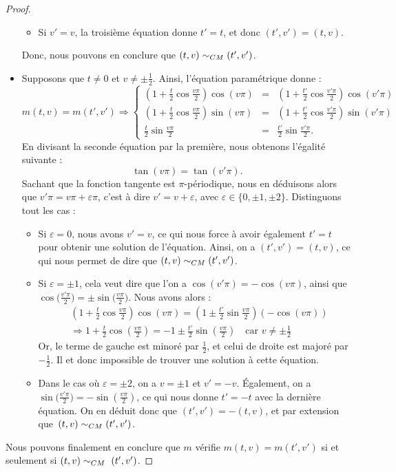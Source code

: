 \documentclass[hidelinks, 10pt]{article}
\begin{document}
\begin{proof}
\begin{itemize}
\begin{itemize}
    \item Si $v'=v$, la troisième équation donne $t'=t$, et donc $(t',v')=(t,v)$.
\end{itemize}
Donc, nous pouvons en conclure que $(t,v)\sim_{CM}(t',v')$.
\item Supposons que $t\neq0$ et $v\neq\pm\frac{1}{2}$. Ainsi, l'équation paramétrique donne : \[m(t,v)=m(t',v')\Rightarrow\left\{\begin{matrix}
\left(1+\frac{t}{2}\cos\frac{v\pi}{2} \right )\cos (v\pi)&=&\left(1+\frac{t'}{2}\cos\frac{v'\pi}{2} \right )\cos (v'\pi)\\ 
\left(1+\frac{t}{2}\cos\frac{v\pi}{2} \right )\sin (v\pi)&=&\left(1+\frac{t'}{2}\cos\frac{v'\pi}{2} \right )\sin (v'\pi)\\ 
\frac{t}{2}\sin\frac{v\pi}{2}&=&\frac{t'}{2}\sin\frac{v'\pi}{2}.
\end{matrix}\right.\]En divisant la seconde équation par la première, nous obtenons l'égalité suivante : $$\tan(v\pi)=\tan(v'\pi).$$ Sachant que la fonction tangente est $\pi$-périodique, nous en déduisons alors que $v'\pi=v\pi+\varepsilon\pi$, c'est à dire $v'=v+\varepsilon$, avec $\varepsilon\in\{0,\pm1,\pm2\}$. Distinguons tout les cas : \begin{itemize}
    \item Si $\varepsilon=0$, nous avons $v'=v$, ce qui nous force à avoir également $t'=t$ pour obtenir une solution de l'équation. Ainsi, on a $(t',v')=(t,v)$, ce qui nous permet de dire que $(t,v)\sim_{CM}(t',v')$.
    \item Si $\varepsilon=\pm1$, cela veut dire que l'on a $\cos(v'\pi)=-\cos(v\pi)$, ainsi que~$\cos\big(\frac{v'\pi}{2}\big)=\pm\sin\big(\frac{v\pi}{2}\big)$. Nous avons alors : \[\begin{split}
    &\left(1+\frac{t}{2}\cos\frac{v\pi}{2} \right )\cos (v\pi)=\left(1\pm\frac{t'}{2}\sin\frac{v\pi}{2} \right )(-\cos (v\pi))\\
    &\Longrightarrow 1+\frac{t}{2}\cos\left(\frac{v\pi}{2}\right)=-1\pm\frac{t'}{2}\sin\left(\frac{v\pi}{2}\right)\quad\text{car }v\neq\pm\frac{1}{2}
    \end{split}\]Or, le terme de gauche est minoré par $\frac{1}{2}$, et celui de droite est majoré par $-\frac{1}{2}$. Il et donc impossible de trouver une solution à cette équation.
    \item Dans le cas où $\varepsilon=\pm2$, on a $v=\pm1$ et $v'=-v$. Également, on a~$\sin\big(\frac{v'\pi}{2}\big)=-\sin\left(\frac{v\pi}{2}\right)$, ce qui nous donne $t'=-t$ avec la dernière équation. On en déduit donc que $(t',v')=-(t,v)$, et par extension que~$(t,v)\sim_{CM}(t',v')$.
\end{itemize}
\end{itemize}Nous pouvons finalement en conclure que $m$ vérifie $m(t,v)=m(t',v')$ si et seulement si $(t,v)\sim_{CM}~(t',v')$.
\end{proof}
\end{document}
